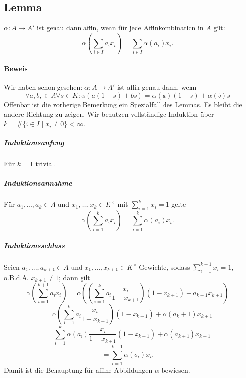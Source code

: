 \subsection{Lemma}
	\begin{Lemma}[]
		$ \alpha:A\to A' $ ist genau dann affin, wenn für jede Affinkombination in $ A $ gilt:
			\[ \alpha(\sum_{i\in I}a_ix_i) = \sum_{i\in I} \alpha(a_i)x_i. \]
	\end{Lemma}
	
\paragraph{Beweis}
	Wir haben schon gesehen: $ \alpha:A\to A' $ ist affin genau dann, wenn
		\[ \forall a,b,\in A\forall s\in K:\alpha(a(1-s)+bs) = \alpha(a)(1-s)+\alpha(b)s \]
	Offenbar ist die vorherige Bemerkung ein Spezialfall des Lemmas. Es bleibt die andere Richtung zu zeigen. Wir benutzen vollständige Induktion über $k = \#\{{i\in I}\mid x_i\neq 0\}<\infty $.
	
\subparagraph{Induktionsanfang}
	Für $ k=1 $ trivial.

\subparagraph{Induktionsannahme}
	Für $ a_1,...,a_k\in A $ und $ x_1,...,x_k \in K^\times$ mit $ \sum_{i=1}^{k}x_i=1 $ gelte
		\[ \alpha(\sum_{i=1}^{k}a_ix_i) = \sum_{i=1}^{k}\alpha(a_i)x_i. \]
	
\subparagraph{Induktionsschluss}
	Seien $ a_1,...,a_{k+1} \in A$ und $ x_1,...,x_{k+1} \in K^\times$ Gewichte, sodass $ \sum_{i=1}^{k+1}x_i = 1 $, o.B.d.A. $ x_{k+1}\neq 1 $; dann gilt
		\[ \alpha(\sum_{i=1}^{k+1}a_ix_i) = \alpha((\sum_{i=1}^{k}a_i\frac{x_i}{1-x_{k+1}})(1-x_{k+1})+a_{k+1}x_{k+1}) \]
		\[ = \alpha(\sum_{i=1}^{k}a_i\frac{x_i}{1-x_{k+1}})(1-x_{k+1})+\alpha(a_k+1)x_{k+1} \]
		\[ = \sum_{i=1}^{k}\alpha(a_i)\frac{x_i}{1-x_{k+1}}(1-x_{k+1})+\alpha(a_{k+1})x_{k+1} \]
		\[ = \sum_{i=1}^{k+1}\alpha(a_i)x_i. \]
	Damit ist die Behauptung für affine Abbildungen $ \alpha $ bewiesen.

